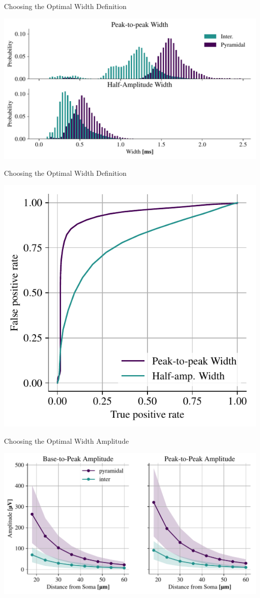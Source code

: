 \documentclass[aspectratio=169]{beamer}
\begin{document}
\begin{frame}{Choosing the Optimal Width Definition}
    \begin{center}
        \includegraphics[width=\textwidth]{images/int_pyr_width_I_II.pdf}
    \end{center}
\end{frame}

\begin{frame}{Choosing the Optimal Width Definition}
    \begin{center}
        \includegraphics[width=.5\textwidth]{images/roc_curves.pdf}
    \end{center}
\end{frame}

\begin{frame}{Choosing the Optimal Width Amplitude}
    \begin{center}
        \includegraphics[width=\textwidth]{images/int_pyr_amps_dist.pdf}
    \end{center}
\end{frame}
\end{document}
